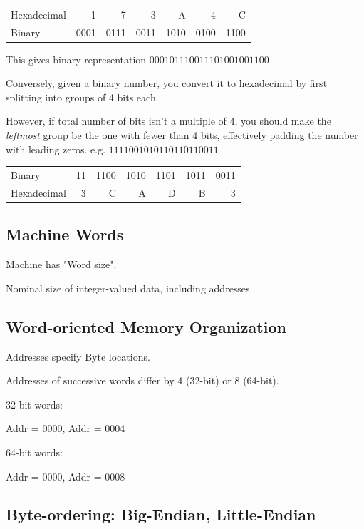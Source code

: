 \documentclass[10pt]{amsart}
\begin{document}
\begin{multicols*}{2}
\begin{center}
	\begin{tabular}{ l | r | r | r | r | r | r }
		Hexadecimal & 1 & 7 & 3 & A & 4 & C \\
		Binary & 0001 & 0111& 0011 & 1010 & 0100 & 1100 \\
	\end{tabular}
\end{center}

This gives binary representation $000101110011101001001100$

Conversely, given a binary number, you convert it to hexadecimal by first splitting into groups of 4 bits each.

However, if total number of bits isn't a multiple of 4, you should make the \emph{leftmost} group be the one with fewer than 4 bits, effectively padding the number with leading zeros. e.g. $1111001010110110110011$

\begin{center}
	\begin{tabular}{ l | r | r | r | r | r | r }
		Binary & 11 & 1100 & 1010 & 1101 & 1011 & 0011 \\
		Hexadecimal & 3 & C & A & D & B & 3 \\
	\end{tabular}
\end{center}


\subsection{Machine Words}

Machine has "Word size".

Nominal size of integer-valued data, including addresses.

\subsection{Word-oriented Memory Organization}

Addresses specify Byte locations. 

Addresses of successive words differ by 4 (32-bit) or 8 (64-bit).

32-bit words:

Addr = 0000, Addr = 0004

64-bit words:

Addr = 0000, Addr = 0008

\subsection{Byte-ordering: Big-Endian, Little-Endian}


\end{multicols*}
\end{document}
